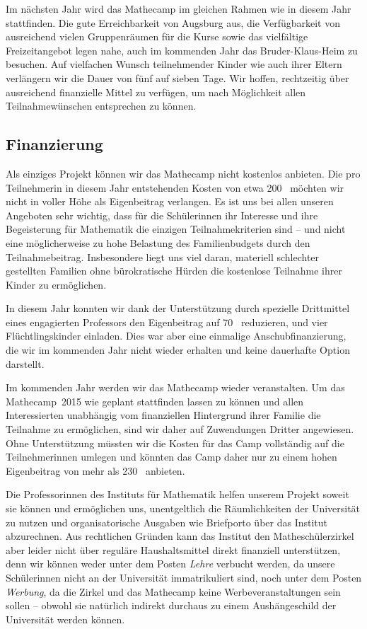 \documentclass[12pt]{zettel}
\newcommand{\twopics}[2]{%
  \begin{figure}[b]%
    \vspace*{0.5cm}%
    \makebox[\textwidth][c]{%
      \texttt{[image: impressionen/\#1]}%
      \hspace*{1cm}%
      \texttt{[image: impressionen/\#2]}%
    }%
    \vspace*{-1cm}%
  \end{figure}
}
\begin{document}
Im nächsten Jahr wird das Mathecamp im gleichen Rahmen wie in diesem Jahr stattfinden. Die gute Erreichbarkeit von Augsburg aus, die Verfügbarkeit von ausreichend vielen
Gruppenräumen für die Kurse sowie das vielfältige Freizeitangebot legen nahe, auch im kommenden Jahr das Bruder-Klaus-Heim zu besuchen. Auf vielfachen Wunsch teilnehmender Kinder wie
auch ihrer Eltern verlängern wir die Dauer von fünf auf sieben Tage. Wir hoffen, rechtzeitig über ausreichend finanzielle Mittel zu verfügen, um nach Möglichkeit allen
Teilnahmewünschen entsprechen zu können.


\subsection{Finanzierung}

Als einziges Projekt können wir das Mathecamp nicht kostenlos anbieten. Die pro Teilnehmerin in diesem
Jahr entstehenden Kosten von etwa 200~\texteuro{} möchten wir nicht in voller Höhe als Eigenbeitrag verlangen. Es ist uns bei allen unseren Angeboten sehr wichtig, dass für die
Schülerinnen ihr Interesse und ihre Begeisterung für Mathematik die einzigen Teilnahmekriterien sind -- und nicht eine möglicherweise zu hohe Belastung des Familienbudgets durch den
Teilnahmebeitrag. Insbesondere liegt uns viel daran, materiell schlechter gestellten Familien ohne bürokratische Hürden die kostenlose Teilnahme ihrer Kinder zu ermöglichen.

\twopics{klein-10}{klein-03}

In diesem Jahr konnten wir dank der Unterstützung durch
spezielle Drittmittel eines engagierten Professors den Eigenbeitrag auf
70~\texteuro{} reduzieren, und vier Flüchtlingskinder einladen. Dies war aber
eine einmalige An\-schub\-fi\-nan\-zie\-rung, die wir im kommenden Jahr nicht wieder
erhalten und keine dauerhafte Option darstellt.

Im kommenden Jahr werden wir das Mathecamp wieder veranstalten. Um das Mathecamp~2015 wie geplant
stattfinden lassen zu können und allen Interessierten unabhängig vom
finanziellen Hintergrund ihrer Familie die Teilnahme zu ermöglichen, sind wir daher auf Zuwendungen
Dritter angewiesen. Ohne Unterstützung müssten wir die Kosten für das Camp vollständig auf die Teilnehmerinnen umlegen und könnten das Camp daher nur zu einem hohen Eigenbeitrag von mehr als 230~\texteuro{} anbieten.

Die Professorinnen des Instituts für Mathematik helfen unserem Projekt soweit sie können
und ermöglichen uns, unentgeltlich die Räumlichkeiten der Universität zu nutzen
und organisatorische Ausgaben wie Briefporto über das Institut abzurechnen.
Aus rechtlichen Gründen kann das Institut den Matheschülerzirkel aber leider nicht
über reguläre Haushaltsmittel direkt finanziell unterstützen, denn wir können weder unter dem Posten
\emph{Lehre} verbucht werden, da unsere Schülerinnen nicht an der Universität
immatrikuliert sind, noch unter dem Posten \emph{Werbung}, da die Zirkel und
das Mathecamp keine Werbeveranstaltungen sein sollen -- obwohl sie natürlich indirekt
durchaus zu einem Aushängeschild der Universität werden können.
\end{document}
